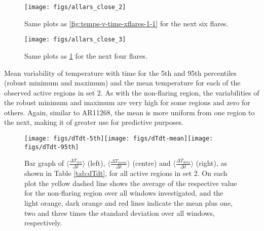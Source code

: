 \documentclass{article}
\begin{document}
\begin{figure}
\begin{centering}
\texttt{[image: figs/allars\_close\_2]} 
\par\end{centering}

\caption{Same plots as \ref{fig:temps-v-time-xflares-1-1} for the next six
flares.\label{fig:temps-v-time-xflares-1-2}}
\end{figure}


\begin{figure}
\begin{centering}
\texttt{[image: figs/allars\_close\_3]} 
\par\end{centering}

\caption{Same plots as \ref{fig:temps-v-time-xflares-1-2} for the next four
flares. \label{fig:temps-v-time-xflares-1-3}}
\end{figure}


\begin{table}
\caption{Mean variability of temperature with time for the 5th and 95th percentiles
(robust minimum and maximum) and the mean temperature for each of
the observed active regions in set 2. As with the non-flaring region,
the variabilities of the robust minimum and maximum are very high
for some regions and zero for others. Again, similar to AR11268, the
mean is more uniform from one region to the next, making it of greater
use for predictive purposes.\label{tab:dTdt}}


\end{table}


\begin{figure}
\begin{centering}
\texttt{[image: figs/dTdt-5th]}\texttt{[image: figs/dTdt-mean]}\texttt{[image: figs/dTdt-95th]}
\par\end{centering}

\caption{Bar graph of $\langle\frac{\Delta T_{5th}}{\Delta t}\rangle$ (left),
$\langle\frac{\Delta T_{mean}}{\Delta t}\rangle$ (centre) and $\langle\frac{\Delta T_{95th}}{\Delta t}\rangle$
(right), as shown in Table \ref{tab:dTdt}, for all active regions
in set 2. On each plot the yellow dashed line shows the average of
the respective value for the non-flaring region over all windows investigated,
and the light orange, dark orange and red lines indicate the mean
plus one, two and three times the standard deviation over all windows,
respectively.\label{fig:Bar-graph-flaring}}
\end{figure}
\end{document}
